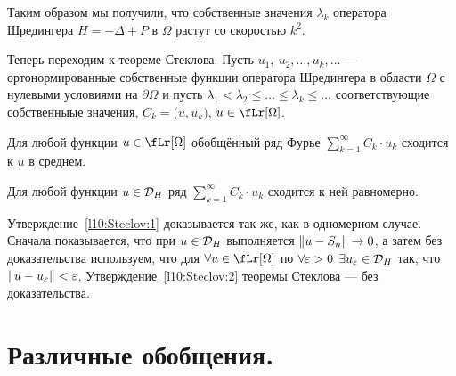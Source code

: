 Таким образом мы получили, что собственные значения $\lambda_k$ оператора Шредингера $H=-\Delta+P$ в $\Omega$ растут со скоростью $k^2$. 

Теперь переходим к теореме Стеклова. Пусть $u_1,\ u_2,\ldots,u_k,\ldots$ --- ортонормированные собственные функции оператора Шредингера в области $\Omega$ с нулевыми условиями на $\partial\Omega$ и пусть $\lambda_1<\lambda_2\leqslant\ldots\leqslant\lambda_k\leqslant\ldots$ соответствующие собственныые значения, $C_k=\big(u,u_k\big)$, $u\in\fLr[\Omega]$. 
\begin{_teor}[Стеклова]\hfill
	\begin{enumerate1}
		\item\label{l10:Steclov:1} Для любой функции $u\in\fLr[\Omega]$ обобщённый ряд Фурье $\displaystyle\sum\limits_{k=1}^{\infty}C_k\cdot u_k$ сходится к $u$ в среднем.
		\item\label{l10:Steclov:2} Для любой функции $u\in\mathcal{D}_{H}$ ряд  $\displaystyle\sum\limits_{k=1}^{\infty}C_k\cdot u_k$ сходится к ней равномерно.
	\end{enumerate1}
\end{_teor}
Утверждение~\ref{l10:Steclov:1} доказывается так же, как в одномерном случае. Сначала показывается, что при $u\in\mathcal{D}_H$ выполняется $\left\|u-S_n\right\|\to0$, а затем без доказательства используем, что для $\forall u\?\in\fLr[\Omega]$ по $\forall\varepsilon>0$ $\exists u_{\varepsilon}\in\mathcal{D}_H$ так, что $\left\|u-u_{\varepsilon}\right\|<\varepsilon$. Утверждение~\ref{l10:Steclov:2} теоремы Стеклова --- без доказательства.

\section{Различные обобщения.}
\label{lecture10section2}
